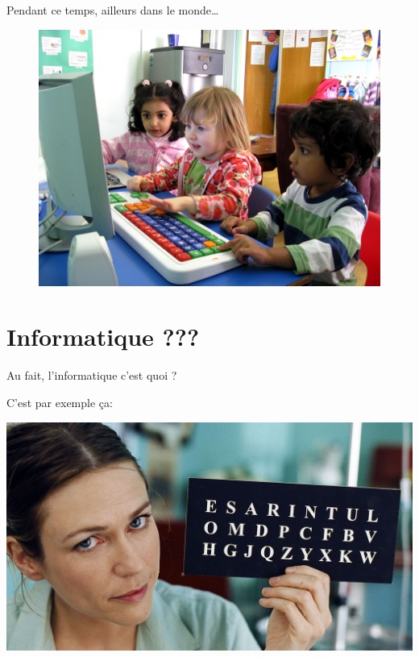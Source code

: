 \documentclass[french]{beamer}
\begin{document}
\begin{frame}
Pendant ce temps, ailleurs dans le monde\ldots{}
\pause
\begin{figure}
\centering
\includegraphics[height=0.7\textheight]{./kids.JPG}
\end{figure}

\end{frame}




\section{Informatique ???}

\begin{frame}
Au fait, l'informatique c'est quoi ?

C'est par exemple ça:
 \begin{center}
\href{https://www.youtube.com/embed/jpfHxfF-Kno}{\includegraphics[height=0.7\textheight]{./papillon.jpg}}
\end{center}
\end{frame}
\end{document}
